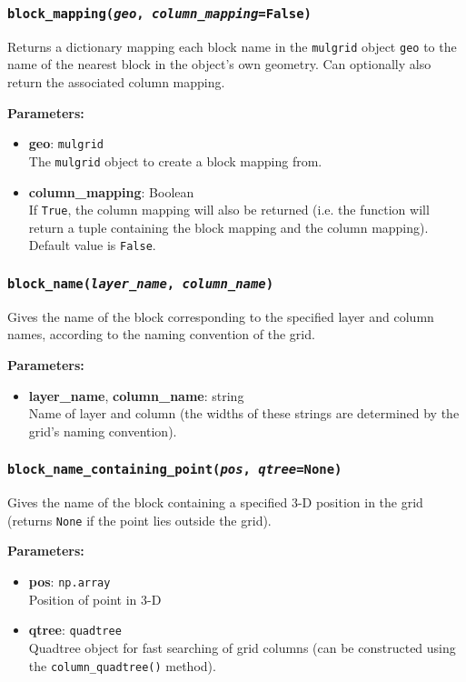 \subsubsection{\texttt{block\_mapping(\emph{geo}, \emph{column\_mapping}=\texttt{False})}}

Returns a dictionary mapping each block name in the \texttt{mulgrid} object \texttt{geo} to the name of the nearest block in the object's own geometry.  Can optionally also return the associated column mapping.

\textbf{Parameters:}
\begin{itemize}
\item \textbf{geo}: \texttt{mulgrid}\\
  The \texttt{mulgrid} object to create a block mapping from.
\item \textbf{column\_mapping}: Boolean\\
  If \texttt{True}, the column mapping will also be returned (i.e. the function will return a tuple containing the block mapping and the column mapping).  Default value is \texttt{False}.
\end{itemize}

\subsubsection{\texttt{block\_name(\emph{layer\_name}, \emph{column\_name})}}

Gives the name of the block corresponding to the specified layer and column names, according to the naming convention of the grid.

\textbf{Parameters:}
\begin{itemize}
\item \textbf{layer\_name}, \textbf{column\_name}: string\\
  Name of layer and column (the widths of these strings are determined by the grid's naming convention).
\end{itemize}

\subsubsection{\texttt{block\_name\_containing\_point(\emph{pos}, \emph{qtree}=None)}}

Gives the name of the block containing a specified 3-D position in the grid (returns \texttt{None} if the point lies outside the grid).

\textbf{Parameters:}
\begin{itemize}
\item \textbf{pos}: \texttt{np.array}\\
  Position of point in 3-D
\item \textbf{qtree}: \texttt{quadtree}\\
  Quadtree object for fast searching of grid columns (can be constructed using the \texttt{column\_quadtree()} method).
\end{itemize}


